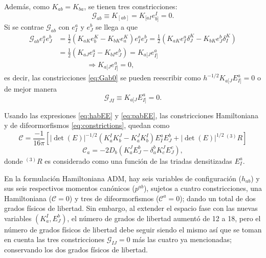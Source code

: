 Adem\'{a}s, como $K_{ab} = K_{ba}$, se tienen tres constricciones:
%
\begin{equation}
\label{eq:Gab0}
\mathcal{G}_{ab} \equiv K_{[ab]} = K_{[aI} e^{I}_{b]} = 0.
\end{equation}
%
Si se contrae $\mathcal{G}_{ab}$ con $e^{a}_{I}$ y $e^{b}_{J}$ se llega a que
%
\begin{align*}
\mathcal{G}_{ab} e^{a}_{I} e^{b}_{J} & = \frac{1}{2}(K_{aK} e^{K}_{b} - K_{bK} e^{K}_{a}) e^{a}_{I} e^{b}_{J} = \frac{1}{2} (K_{aK} e^{a}_{I} \delta^{K}_{J} - K_{bK} e^{b}_{J} \delta^{K}_{I}) \\
& = \frac{1}{2} (K_{aJ} e^{a}_{I} - K_{bI} e^{b}_{J}) = K_{a[J} e^{a}_{I]} \\
& \qquad \qquad \Longrightarrow K_{a[J} e^{a}_{I]} = 0,
\end{align*}
%
es decir, las constricciones \eqref{eq:Gab0} se pueden reescribir como $h^{-1/2} K_{a[J} E^{a}_{I]} = 0$ o de mejor manera
%
\begin{equation}
\label{eq:GJI0}
\mathcal{G}_{JI} \equiv K_{a[J} E^{a}_{I]} = 0.
\end{equation}

Usando las expresiones \eqref{eq:habEE} y \eqref{eq:pabEE}, las constricciones Hamiltoniana y de difeormorfismos \eqref{eq:constrictions}, quedan como
%
\begin{equation}
\label{eq:CEE}
\mathcal{C} = \frac{-1}{16 \pi} [|\det(E)|^{-1/2} (K^{I}_{a} K^{J}_{b} - K^{J}_{a} K^{I}_{b}) E^{a}_{I} E^{b}_{J} + |\det(E)|^{1/2} \, ^{(3)}R]
\end{equation}
%
\begin{equation}
\label{eq:CaEE}
\mathcal{C}_{a} = -2 D_{b} (K^{J}_{a} E^{b}_{J} - \delta^{b}_{a} K^{J}_{c} E^{c}_{J}),
\end{equation}
%
donde $^{(3)}R$ es considerado como una funci\'{o}n de las triadas densitizadas $E^{a}_{I}$.

En la formulaci\'{o}n Hamiltoniana ADM, hay seis variables de configuraci\'{o}n ($h_{ab}$) y sus seis respectivos momentos can\'{o}nicos ($p^{ab}$), sujetos a cuatro constricciones, una Hamiltoniana ($\mathcal{C} = 0$) y tres de difeormorfismos ($\mathcal{C}^{a} = 0$); dando un total de dos grados f\'{i}sicos de libertad\footnotemark. Sin embargo, al extender el espacio fase con las nuevas variables $(K^{I}_{a}, E^{b}_{J})$, el n\'{u}mero de grados de libertad aument\'{o} de 12 a 18, pero el n\'{u}mero de grados f\'{i}sicos de libertad debe seguir siendo el mismo as\'{i} que se toman en cuenta las tres constricciones $\mathcal{G}_{IJ} = 0$ m\'{a}s las cuatro ya mencionadas; conservando los dos grados f\'{i}sicos de libertad.

